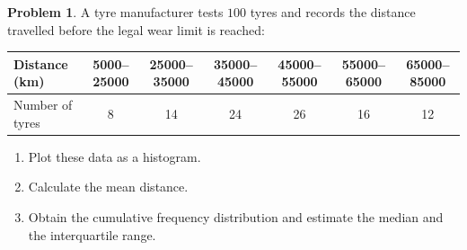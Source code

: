 \documentclass[11pt,a4paper]{article}
\theoremstyle{definition}
\newtheorem{problemx}{Problem}[section]
\newenvironment{problem}{\begin{problemx}}{\end{problemx}}
\begin{document}
\begin{problem}
A tyre manufacturer tests $100$ tyres and records the distance travelled before the legal
wear limit is reached:
\begin{table}[H]
\centering
\begin{tabular}{|l|c|c|c|c|c|c|}
\hline
Distance (km) & 5000--25000 & 25000--35000 & 35000--45000 & 45000--55000 & 55000--65000 & 65000--85000\\
\hline
Number of tyres & 8 & 14 & 24 & 26 & 16 & 12\\
\hline
\end{tabular}
\end{table}
\begin{enumerate}
\item[(a).] Plot these data as a histogram.
\item[(b).] Calculate the mean distance.
\item[(c).] Obtain the cumulative frequency distribution and estimate the median and the
interquartile range.
\end{enumerate}
\end{problem}
\end{document}
